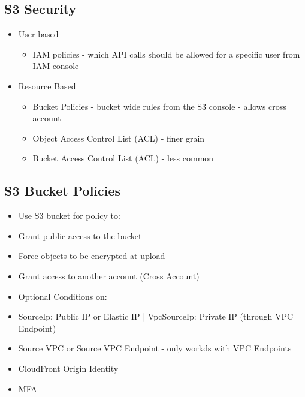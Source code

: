 \subsection{S3 Security}
\begin{itemize}
    \item User based
    \begin{itemize}
        \item IAM policies - which API calls should be allowed for a specific user from IAM console
    \end{itemize}

    \item Resource Based
    \begin{itemize}
        \item Bucket Policies - bucket wide rules from the S3 console - allows cross account
        \item Object Access Control List (ACL) - finer grain
        \item Bucket Access Control List (ACL) - less common
    \end{itemize}
\end{itemize}

\subsection{S3 Bucket Policies}
\begin{itemize}
    \item Use S3 bucket for policy to:
    \item Grant public access to the bucket
    \item Force objects to be encrypted at upload
    \item Grant access to another account (Cross Account)
    \item Optional Conditions on:
    \item SourceIp: Public IP or Elastic IP | VpcSourceIp: Private IP (through VPC Endpoint)
    \item Source VPC or Source VPC Endpoint - only workds with VPC Endpoints
    \item CloudFront Origin Identity
    \item MFA
\end{itemize}


